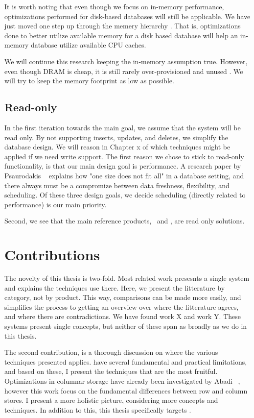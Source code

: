 It is worth noting that even though we focus on in-memory performance, optimizations performed for disk-based databases will still be applicable. We have just moved one step up through the memery hierarchy \cite{Boncz2002-yj}. That is, optimizations done to better utilize available memory for a disk based database will help an in-memory database utilize available CPU caches. 

We will continue this research keeping the in-memory assumption true. However, even though DRAM is cheap, it is still rarely over-provisioned and unused \cite{Barber2014-ey}. We will try to keep the memory footprint as low as possible.

\subsection{Read-only}
\label{sub:Read-only}
In the first iteration towards the main goal, we assume that the system will be read only. By not supporting inserts, updates, and deletes, we simplify the database design. We will reason in Chapter x of which techniques might be applied if we need write support.
The first reason we chose to stick to read-only functionality, is that our main design goal is performance. A research paper by Psaurodakis \ea~\cite{Psaroudakis2014-ma} explains how "one size does not fit all" in a database setting, and there always must be a compromize between data freshness, flexibility, and scheduling. Of these three design goals, we decide scheduling (directly related to performance) is our main priority.

Second, we see that the main reference products, \qlikview~and \tableau, are read only solutions.


%


\section{Contributions}
\label{sec:Contributions}
The novelty of this thesis is two-fold. Most related work presesnts a single system and explains the techniques use there. Here, we present the litterature by category, not by product. This way, comparisons can be made more easily, and simplifies the process to getting an overview over where the litterature agrees, and where there are contradictions. We have found work X and work Y. These systems present single concepts, but neither of these span as broadly as we do in this thesis.

The second contribution, is a thorough discussion on where the various techniques presented applies. \genusSoftware have several fundamental and practical limitations, and based on these, I present the techniques that are the most fruitful. Optimizations in columnar storage have already been investigated by Abadi \ea~\cite{Abadi2008-dd}, however this work focus on the fundamental differences between row and column stores. I present a more holistic picture, considering more concepts and techniques. In addition to this, this thesis specifically targets \genusSoftware.




